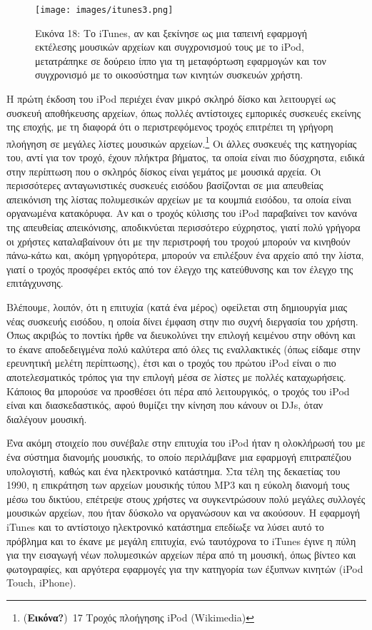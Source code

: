 \documentclass[
]{article}
\begin{document}
\leavevmode{}%
\begin{figure}
\hypertarget{fig:itunes3}{%
\centering
\texttt{[image: images/itunes3.png]}
\caption{Εικόνα 18: Το iTunes, αν και ξεκίνησε ως μια ταπεινή εφαρμογή
εκτέλεσης μουσικών αρχείων και συγχρονισμού τους με το iPod, μετατράπηκε
σε δούρειο ίππο για τη μεταφόρτωση εφαρμογών και τον συγχρονισμό με το
οικοσύστημα των κινητών συσκευών χρήστη.}\label{fig:itunes3}
}
\end{figure}

Η πρώτη έκδοση του iPod περιέχει έναν μικρό σκληρό δίσκο και λειτουργεί
ως συσκευή αποθήκευσης αρχείων, όπως πολλές αντίστοιχες εμπορικές
συσκευές εκείνης της εποχής, με τη διαφορά ότι ο περιστρεφόμενος τροχός
επιτρέπει τη γρήγορη πλοήγηση σε μεγάλες λίστες μουσικών
αρχείων.\footnote{(\textbf{Εικόνα?})~17 Τροχός πλοήγησης iPod
  (Wikimedia)} Οι άλλες συσκευές της κατηγορίας του, αντί για τον τροχό,
έχουν πλήκτρα βήματος, τα οποία είναι πιο δύσχρηστα, ειδικά στην
περίπτωση που ο σκληρός δίσκος είναι γεμάτος με μουσικά αρχεία. Οι
περισσότερες ανταγωνιστικές συσκευές εισόδου βασίζονται σε μια απευθείας
απεικόνιση της λίστας πολυμεσικών αρχείων με τα κουμπιά εισόδου, τα
οποία είναι οργανωμένα κατακόρυφα. Αν και ο τροχός κύλισης του iPod
παραβαίνει τον κανόνα της απευθείας απεικόνισης, αποδικνύεται
περισσότερο εύχρηστος, γιατί πολύ γρήγορα οι χρήστες καταλαβαίνουν ότι
με την περιστροφή του τροχού μπορούν να κινηθούν πάνω-κάτω και, ακόμη
γρηγορότερα, μπορούν να επιλέξουν ένα αρχείο από την λίστα, γιατί ο
τροχός προσφέρει εκτός από τον έλεγχο της κατεύθυνσης και τον έλεγχο της
επιτάγχυνσης.

Βλέπουμε, λοιπόν, ότι η επιτυχία (κατά ένα μέρος) οφείλεται στη
δημιουργία μιας νέας συσκευής εισόδου, η οποία δίνει έμφαση στην πιο
συχνή διεργασία του χρήστη. Όπως ακριβώς το ποντίκι ήρθε να διευκολύνει
την επιλογή κειμένου στην οθόνη και το έκανε αποδεδειγμένα πολύ καλύτερα
από όλες τις εναλλακτικές (όπως είδαμε στην ερευνητική μελέτη
περίπτωσης), έτσι και ο τροχός του πρώτου iPod είναι ο πιο
αποτελεσματικός τρόπος για την επιλογή μέσα σε λίστες με πολλές
καταχωρήσεις. Κάποιος θα μπορούσε να προσθέσει ότι πέρα από
λειτουργικός, ο τροχός του iPod είναι και διασκεδαστικός, αφού θυμίζει
την κίνηση που κάνουν οι DJs, όταν διαλέγουν μουσική.

Ένα ακόμη στοιχείο που συνέβαλε στην επιτυχία του iPod ήταν η ολοκλήρωσή
του με ένα σύστημα διανομής μουσικής, το οποίο περιλάμβανε μια εφαρμογή
επιτραπέζιου υπολογιστή, καθώς και ένα ηλεκτρονικό κατάστημα. Στα τέλη
της δεκαετίας του 1990, η επικράτηση των αρχείων μουσικής τύπου MP3 και
η εύκολη διανομή τους μέσω του δικτύου, επέτρεψε στους χρήστες να
συγκεντρώσουν πολύ μεγάλες συλλογές μουσικών αρχείων, που ήταν δύσκολο
να οργανώσουν και να ακούσουν. Η εφαρμογή iTunes και το αντίστοιχο
ηλεκτρονικό κατάστημα επεδίωξε να λύσει αυτό το πρόβλημα και το έκανε με
μεγάλη επιτυχία, ενώ ταυτόχρονα το iTunes έγινε η πύλη για την εισαγωγή
νέων πολυμεσικών αρχείων πέρα από τη μουσική, όπως βίντεο και
φωτογραφίες, και αργότερα εφαρμογές για την κατηγορία των έξυπνων
κινητών (iPod Touch, iPhone).
\end{document}
